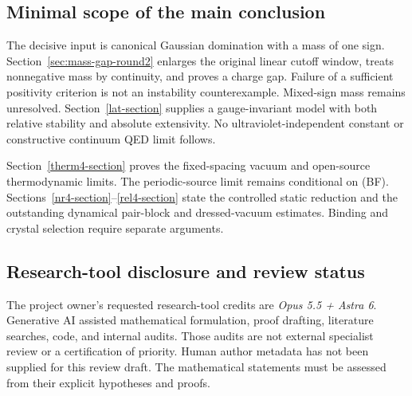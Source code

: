 \subsection{Minimal scope of the main conclusion}
The decisive input is canonical Gaussian domination with a mass of
one sign. Section~\ref{sec:mass-gap-round2} enlarges the original
linear cutoff window, treats nonnegative mass by continuity, and
proves a charge gap. Failure of a sufficient positivity criterion is
not an instability counterexample. Mixed-sign mass remains unresolved.
Section~\ref{lat-section} supplies a gauge-invariant model with both
relative stability and absolute extensivity. No ultraviolet-independent
constant or constructive continuum QED limit follows.

Section~\ref{therm4-section} proves the fixed-spacing vacuum and
open-source thermodynamic limits. The periodic-source limit remains
conditional on (BF). Sections~\ref{nr4-section}--\ref{rel4-section}
state the controlled static reduction and the outstanding dynamical
pair-block and dressed-vacuum estimates. Binding and crystal
selection require separate arguments.

\subsection{Research-tool disclosure and review status}
The project owner's requested research-tool credits are
\emph{Opus 5.5 + Astra 6}. Generative AI assisted mathematical
formulation, proof drafting, literature searches, code, and internal
audits. Those audits are not external specialist review or a
certification of priority. Human author metadata has not been supplied
for this review draft. The mathematical statements must be assessed
from their explicit hypotheses and proofs.
